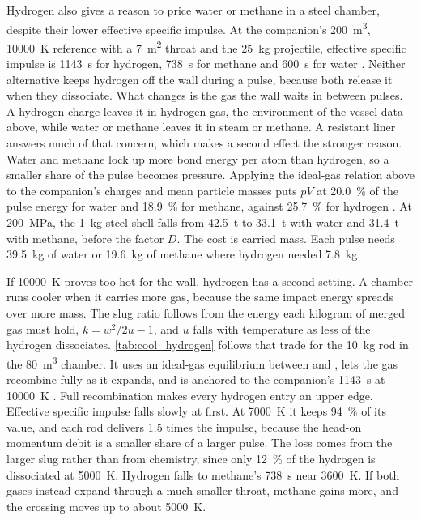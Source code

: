 \documentclass{article}
\begin{document}
Hydrogen also gives a reason to price water or methane in a steel chamber, despite their lower effective specific impulse. At the companion's \SI{200}{\cubic\meter}, \SI{10000}{\kelvin} reference with a \SI{7}{\square\meter} throat and the \SI{25}{\kilogram} projectile, effective specific impulse is \SI{1143}{\second} for hydrogen, \SI{738}{\second} for methane and \SI{600}{\second} for water \cite{Katz_puffsat_impact_sim_2026}. Neither alternative keeps hydrogen off the wall during a pulse, because both release it when they dissociate. What changes is the gas the wall waits in between pulses. A hydrogen charge leaves it in hydrogen gas, the environment of the vessel data above, while water or methane leaves it in steam or methane. A resistant liner answers much of that concern, which makes a second effect the stronger reason. Water and methane lock up more bond energy per atom than hydrogen, so a smaller share of the pulse becomes pressure. Applying the ideal-gas relation above to the companion's charges and mean particle masses puts $pV$ at \SI{20.0}{\percent} of the pulse energy for water and \SI{18.9}{\percent} for methane, against \SI{25.7}{\percent} for hydrogen \cite{Katz_puffsat_impact_sim_2026}. At \SI{200}{\mega\pascal}, the \SI{1}{\kilogram} steel shell falls from \SI{42.5}{\tonne} to \SI{33.1}{\tonne} with water and \SI{31.4}{\tonne} with methane, before the factor $D$. The cost is carried mass. Each pulse needs \SI{39.5}{\kilogram} of water or \SI{19.6}{\kilogram} of methane where hydrogen needed \SI{7.8}{\kilogram}.

If \SI{10000}{\kelvin} proves too hot for the wall, hydrogen has a second setting. A chamber runs cooler when it carries more gas, because the same impact energy spreads over more mass. The slug ratio follows from the energy each kilogram of merged gas must hold, $k=w^2/2u-1$, and $u$ falls with temperature as less of the hydrogen dissociates. \autoref{tab:cool_hydrogen} follows that trade for the \SI{10}{\kilogram} rod in the \SI{80}{\cubic\meter} chamber. It uses an ideal-gas equilibrium between  and , lets the gas recombine fully as it expands, and is anchored to the companion's \SI{1143}{\second} at \SI{10000}{\kelvin} \cite{Katz_puffsat_impact_sim_2026}. Full recombination makes every hydrogen entry an upper edge. Effective specific impulse falls slowly at first. At \SI{7000}{\kelvin} it keeps \SI{94}{\percent} of its value, and each rod delivers 1.5 times the impulse, because the head-on momentum debit is a smaller share of a larger pulse. The loss comes from the larger slug rather than from chemistry, since only \SI{12}{\percent} of the hydrogen is dissociated at \SI{5000}{\kelvin}. Hydrogen falls to methane's \SI{738}{\second} near \SI{3600}{\kelvin}. If both gases instead expand through a much smaller throat, methane gains more, and the crossing moves up to about \SI{5000}{\kelvin}.
\end{document}
